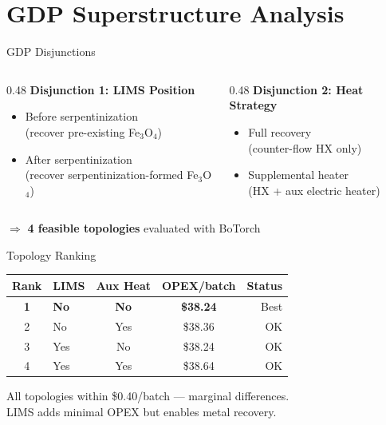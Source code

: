 \documentclass[aspectratio=169]{beamer}
\begin{document}
\section{GDP Superstructure Analysis}

\begin{frame}{GDP Disjunctions}
\begin{columns}[T]
\begin{column}{0.48\textwidth}
\textbf{Disjunction 1: LIMS Position}
\begin{itemize}
  \item \textcolor{StepGreen}{Before} serpentinization\\
        {\small(recover pre-existing Fe$_3$O$_4$)}
  \item \textcolor{StepGreen}{After} serpentinization\\
        {\small(recover serpentinization-formed Fe$_3$O$_4$)}
\end{itemize}
\end{column}
\begin{column}{0.48\textwidth}
\textbf{Disjunction 2: Heat Strategy}
\begin{itemize}
  \item \textcolor{StepGreen}{Full recovery}\\
        {\small(counter-flow HX only)}
  \item \textcolor{StepGreen}{Supplemental heater}\\
        {\small(HX + aux electric heater)}
\end{itemize}
\end{column}
\end{columns}

\vspace{12pt}
\centering
$\Rightarrow$ \textbf{4 feasible topologies} evaluated with BoTorch
\end{frame}

\begin{frame}{Topology Ranking}
\centering
\begin{tabular}{@{}clccr@{}}
\toprule
\textbf{Rank} & \textbf{LIMS} & \textbf{Aux Heat} & \textbf{OPEX/batch} & \textbf{Status} \\
\midrule
\textbf{1} & \textbf{No} & \textbf{No} & \textbf{\$38.24} & \textcolor{StepGreen}{Best} \\
2 & No & Yes & \$38.36 & OK \\
3 & Yes & No & \$38.24 & OK \\
4 & Yes & Yes & \$38.64 & OK \\
\bottomrule
\end{tabular}

\vspace{10pt}
{\small All topologies within \$0.40/batch --- marginal differences.\\
LIMS adds minimal OPEX but enables metal recovery.}
\end{frame}
\end{document}
